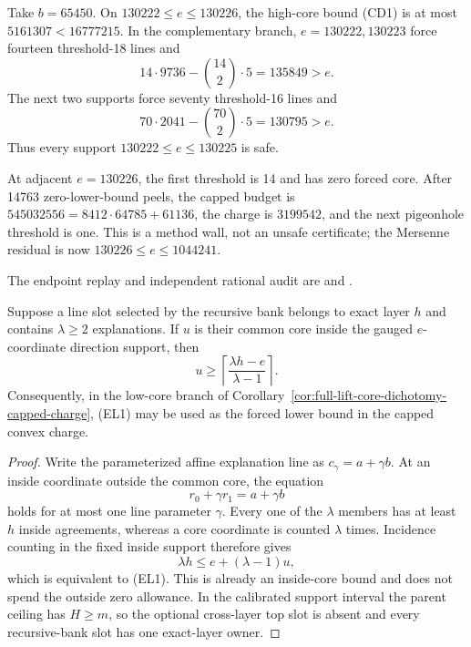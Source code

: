 \documentclass[11pt,a4paper]{amsart}
\numberwithin{equation}{section}
\theoremstyle{remark}
\begin{document}
\begin{remark}
Take $b=65450$.  On $130222\le e\le130226$, the high-core bound (CD1)
is at most $5161307<16777215$.  In the complementary branch,
$e=130222,130223$ force fourteen threshold-18 lines and
\[
 14\cdot9736-\binom{14}{2}\cdot5=135849>e.
\]
The next two supports force seventy threshold-16 lines and
\[
 70\cdot2041-\binom{70}{2}\cdot5=130795>e.
\]
Thus every support $130222\le e\le130225$ is safe.

At adjacent $e=130226$, the first threshold is 14 and has zero forced
core.  After 14763 zero-lower-bound peels, the capped budget is
$545032556=8412\cdot64785+61136$, the charge is $3199542$, and the
next pigeonhole threshold is one.  This is a method wall, not an unsafe
certificate; the Mersenne residual is now
$130226\le e\le1044241$.

The endpoint replay and independent rational audit are
and
.
\end{remark}

\begin{corollary}
\label{cor:full-lift-exact-layer-slot-core}
Suppose a line slot selected by the recursive bank belongs to exact layer
$h$ and contains $\lambda\ge2$ explanations.  If $u$ is their common core
inside the gauged $e$-coordinate direction support, then
\[
 u\ge\left\lceil\frac{\lambda h-e}{\lambda-1}\right\rceil. \tag{EL1}
\]
Consequently, in the low-core branch of
Corollary~\ref{cor:full-lift-core-dichotomy-capped-charge}, (EL1) may be used
as the forced lower bound in the capped convex charge.
\end{corollary}

\begin{proof}
Write the parameterized affine explanation line as
$c_\gamma=a+\gamma b$.  At an inside coordinate outside the common core,
the equation
\[
 r_0+\gamma r_1=a+\gamma b
\]
holds for at most one line parameter $\gamma$.  Every one of the $\lambda$
members has at least $h$ inside agreements, whereas a core coordinate is
counted $\lambda$ times.  Incidence counting in the fixed inside support
therefore gives
\[
 \lambda h\le e+(\lambda-1)u,
\]
which is equivalent to (EL1).  This is already an inside-core bound and
does not spend the outside zero allowance.  In the calibrated support
interval the parent ceiling has $H\ge m$, so the optional cross-layer top
slot is absent and every recursive-bank slot has one exact-layer owner.
\end{proof}
\end{document}
